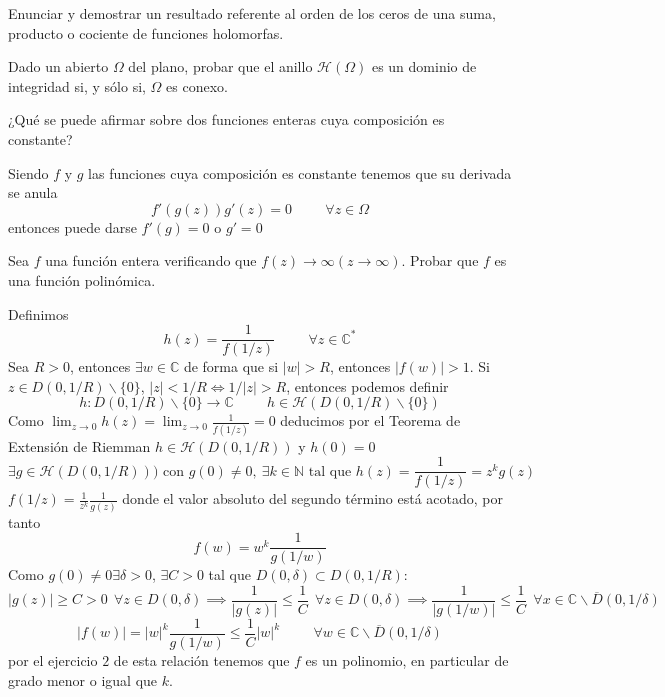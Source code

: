 \begin{ejer}
	Enunciar y demostrar un resultado referente al orden de los ceros de una suma, producto o cociente de funciones holomorfas.
\end{ejer}

\begin{ejer}
	Dado un abierto $\Omega$ del plano, probar que el anillo $\mathcal{H}(\Omega)$ es un dominio de integridad si, y sólo si, $\Omega$ es conexo.
\end{ejer}


\begin{ejer}
	¿Qué se puede afirmar sobre dos funciones enteras cuya composición es constante?
\end{ejer}
\begin{sol}
Siendo $f$ y $g$ las funciones cuya composición es constante tenemos que su derivada se anula
$$f'(g(z)) g'(z) = 0 \hspace{1cm} \forall z\in\Omega$$
entonces puede darse
$f'(g)=0$ o $g'=0$
\end{sol}

\begin{ejer}
	Sea $f$ una función entera verificando que $f(z)\rightarrow\infty (z\rightarrow\infty)$. Probar que $f$ es una función polinómica.
\end{ejer}
\begin{sol}
Definimos
$$h(z) = \frac{1}{f(1/z)} \hspace{1cm} \forall z\in\mathbb{C}^{\ast}$$
Sea $R>0$, entonces $\exists w\in\mathbb{C}$ de forma que si $|w|>R$, entonces $|f(w)|>1$.
Si $z\in D(0,1/R)\backslash\{0\}$, $|z|<1/R \Longleftrightarrow 1/|z|>R$, entonces podemos definir
$$h : D(0,1/R)\backslash\{0\} \rightarrow \mathbb{C} \hspace{1cm} h\in\mathcal{H}(D(0,1/R)\backslash\{0\})$$
Como $\lim_{z\rightarrow 0} h(z) = \lim_{z\rightarrow 0} \frac{1}{f(1/z)} = 0$ deducimos por el Teorema de Extensión de Riemman
$h\in\mathcal{H}(D(0,1/R))$ y $h(0)=0$
$$\exists g\in\mathcal{H}(D(0,1/R))) \text{ con }g(0) \not = 0, \ \exists k\in\mathbb{N} \text{ tal que }h(z) = \frac{1}{f(1/z)} = z^k g(z)$$
$ f(1/z) = \frac{1}{z^k}\frac{1}{g(z)}$
donde el valor absoluto del segundo término está acotado, por tanto
$$f(w) = w^k \frac{1}{g(1/w)}$$
Como $g(0)\not = 0 \exists\delta>0$, $\exists C>0$ tal que $D(0,\delta)\subset D(0,1/R)$:
$$|g(z)| \geq C > 0 \ \ \forall z\in D(0,\delta) \implies \frac{1}{|g(z)|} \leq \frac{1}{C} \ \ \forall z\in D(0,\delta) \implies \frac{1}{|g(1/w)|} \leq \frac{1}{C} \ \ \forall x\in \mathbb{C}\backslash \overline{D}(0,1/\delta)$$
$$|f(w)| = |w|^k \frac{1}{g(1/w)} \leq \frac{1}{C}|w|^k \hspace{1cm} \forall w\in \mathbb{C}\backslash\overline{D}(0,1/\delta)$$
por el ejercicio $2$ de esta relación tenemos que $f$ es un polinomio, en particular de grado menor o igual que $k$.
\end{sol}

